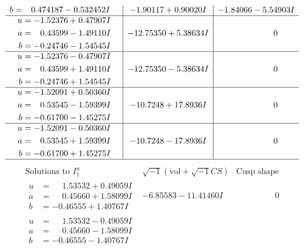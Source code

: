 \documentclass[1p]{elsarticle_modified}
\theoremstyle{definition}
\newcommand{\I}{\sqrt{-1}}
\begin{document}
$$\begin{array}{c|c|c}
\begin{aligned}
b &= \phantom{-}0.474187 - 0.532452 I\end{aligned}
 & -1.90117 + 0.90020 I & -1.84066 - 5.54903 I \\ \hline\begin{aligned}
u &= -1.52376 + 0.47907 I \\
a &= \phantom{-}0.43599 - 1.49110 I \\
b &= -0.24746 - 1.54545 I\end{aligned}
 & -12.75350 + 5.38634 I & \phantom{-0.000000 } 0 \\ \hline\begin{aligned}
u &= -1.52376 - 0.47907 I \\
a &= \phantom{-}0.43599 + 1.49110 I \\
b &= -0.24746 + 1.54545 I\end{aligned}
 & -12.75350 - 5.38634 I & \phantom{-0.000000 } 0 \\ \hline\begin{aligned}
u &= -1.52091 + 0.50360 I \\
a &= \phantom{-}0.53545 - 1.59399 I \\
b &= -0.61700 - 1.45275 I\end{aligned}
 & -10.7248 + 17.8936 I & \phantom{-0.000000 } 0 \\ \hline\begin{aligned}
u &= -1.52091 - 0.50360 I \\
a &= \phantom{-}0.53545 + 1.59399 I \\
b &= -0.61700 + 1.45275 I\end{aligned}
 & -10.7248 - 17.8936 I & \phantom{-0.000000 } 0\\
 \hline 
 \end{array}$$\newpage$$\begin{array}{c|c|c}  
\text{Solutions to }I^u_{1}& \I (\text{vol} + \sqrt{-1}CS) & \text{Cusp shape}\\
 \hline 
\begin{aligned}
u &= \phantom{-}1.53532 + 0.49059 I \\
a &= \phantom{-}0.45660 + 1.58099 I \\
b &= -0.46555 + 1.40767 I\end{aligned}
 & -6.85583 - 11.41460 I & \phantom{-0.000000 } 0 \\ \hline\begin{aligned}
u &= \phantom{-}1.53532 - 0.49059 I \\
a &= \phantom{-}0.45660 - 1.58099 I \\
b &= -0.46555 - 1.40767 I\end{aligned}

\end{array}$$
\end{document}
